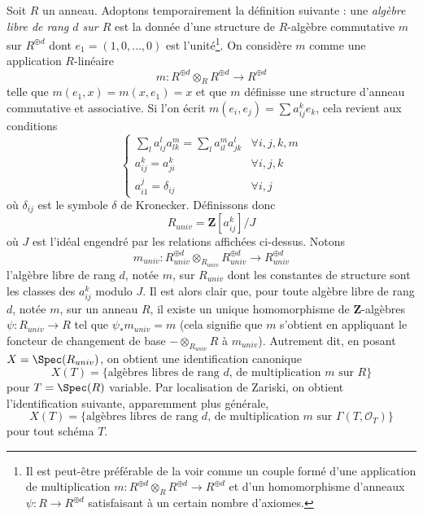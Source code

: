 \medskip\noindent
Soit $R$ un anneau. Adoptons temporairement la définition suivante :
une {\it algèbre libre de rang $d$ sur $R$}
est la donnée d'une structure de $R$-algèbre commutative $m$ sur $R^{\oplus d}$
dont $e_1 = (1, 0, \ldots, 0)$ est l'unité\footnote{Il est peut-être préférable
de la voir comme un couple formé d'une application de multiplication
$m : R^{\oplus d} \otimes_R R^{\oplus d} \to R^{\oplus d}$ et
d'un homomorphisme d'anneaux $\psi : R \to R^{\oplus d}$ satisfaisant à un certain nombre d'axiomes.}.
On considère $m$ comme une application $R$-linéaire
$$
m : R^{\oplus d} \otimes_R R^{\oplus d} \longrightarrow R^{\oplus d}
$$
telle que $m(e_1, x) = m(x, e_1) = x$ et que $m$ définisse une
structure d'anneau commutative et associative. Si l'on écrit
$m(e_i, e_j) = \sum a_{ij}^ke_k$, cela revient
aux conditions
$$
\left\{
\begin{matrix}
\sum_l a_{ij}^la_{lk}^m = \sum_l a_{il}^ma_{jk}^l & \forall i, j, k, m \\
a_{ij}^k = a_{ji}^k & \forall i, j, k \\
a_{i1}^j = \delta_{ij} & \forall i, j
\end{matrix}
\right.
$$
où $\delta_{ij}$ est le symbole $\delta$ de Kronecker. Définissons donc
$$
R_{univ} = \mathbf{Z}[a_{ij}^k]/J
$$
où $J$ est l'idéal engendré par les relations affichées ci-dessus.
Notons
$$
m_{univ} :
R_{univ}^{\oplus d} \otimes_{R_{univ}} R_{univ}^{\oplus d}
\longrightarrow
R_{univ}^{\oplus d}
$$
l'algèbre libre de rang $d$, notée $m$, sur $R_{univ}$ dont les constantes
de structure sont les classes des $a_{ij}^k$ modulo $J$.
Il est alors clair que, pour toute algèbre libre de rang $d$, notée $m$, sur un anneau
$R$, il existe un unique homomorphisme de $\mathbf{Z}$-algèbres
$\psi : R_{univ} \to R$ tel que $\psi_*m_{univ} = m$ (cela signifie que
$m$ s'obtient en appliquant le foncteur de changement de base
$- \otimes_{R_{univ}} R$ à $m_{univ}$). Autrement dit, en posant
$X = \Spec(R_{univ})$, on obtient une identification canonique
$$
X(T) = \{\text{algèbres libres de rang }d\text{, de multiplication }m\text{ sur }R\}
$$
pour $T = \Spec(R)$ variable. Par localisation de Zariski, on obtient
l'identification suivante, apparemment plus générale,
\begin{equation}
\label{equation-objects}
X(T) = \{\text{algèbres libres de rang }d\text{, de multiplication }
m\text{ sur }\Gamma(T, \mathcal{O}_T)\}
\end{equation}
pour tout schéma $T$.

